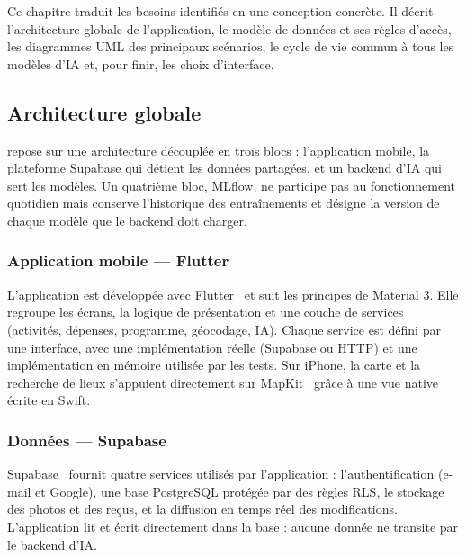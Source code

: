 
Ce chapitre traduit les besoins identifiés en une conception concrète. Il décrit
l'architecture globale de l'application, le modèle de données et ses règles d'accès, les
diagrammes UML des principaux scénarios, le cycle de vie commun à tous les modèles d'IA et,
pour finir, les choix d'interface.

\subsection{Architecture globale}

\equipay repose sur une architecture découplée en trois blocs : l'application mobile, la
plateforme Supabase qui détient les données partagées, et un backend d'IA qui sert les
modèles. Un quatrième bloc, MLflow, ne participe pas au fonctionnement quotidien mais
conserve l'historique des entraînements et désigne la version de chaque modèle que le
backend doit charger.

\subsubsection{Application mobile --- Flutter}

L'application est développée avec Flutter~\cite{flutter} et suit les principes de Material 3.
Elle regroupe les écrans, la logique de présentation et une couche de services (activités,
dépenses, programme, géocodage, IA). Chaque service est défini par une interface, avec une
implémentation réelle (Supabase ou HTTP) et une implémentation en mémoire utilisée par les
tests. Sur iPhone, la carte et la recherche de lieux s'appuient directement sur MapKit~\cite{mapkit}
grâce à une vue native écrite en Swift.

\subsubsection{Données --- Supabase}

Supabase~\cite{supabase} fournit quatre services utilisés par l'application :
l'authentification (e-mail et Google), une base PostgreSQL protégée par des règles RLS, le
stockage des photos et des reçus, et la diffusion en temps réel des modifications. L'application
lit et écrit directement dans la base : aucune donnée ne transite par le backend d'IA.

